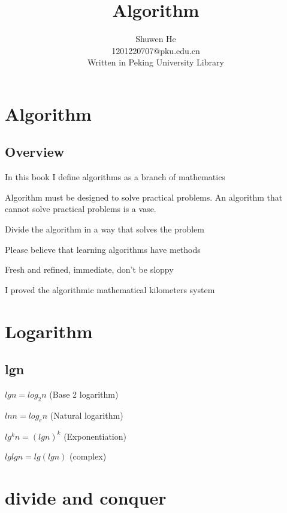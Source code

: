 \documentclass[oneside,12pt,twiside,a4paper]{ctexbook}
\begin{document}
\author
{
Shuwen He\\
1201220707@pku.edu.cn\\
Written in Peking University Library
}

\title{Algorithm}
\maketitle
\tableofcontents


%
\chapter{Algorithm}
\section{Overview}
In this book I define algorithms as a branch of mathematics

Algorithm must be designed to solve practical problems. An algorithm that cannot solve practical problems is a vase.

Divide the algorithm in a way that solves the problem

Please believe that learning algorithms have methods

Fresh and refined, immediate, don't be sloppy

I proved the algorithmic mathematical kilometers system
%
\chapter{Logarithm}
\section{lgn}
$lgn = log_2n$ (Base 2 logarithm)

$lnn=log_en$ (Natural logarithm)

$lg^kn=(lgn)^k$ (Exponentiation)

$lglgn = lg(lgn)$ (complex)

%
\chapter{divide and conquer}
\end{document}

